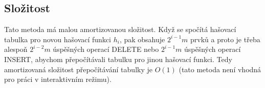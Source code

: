 \subsection{Složitost}

Tato metoda má malou amortizovanou složitost. Když se spočítá hašovací 
tabulka pro novou hašovací funkci $h_i$, pak obsahuje $2^{i-1}m$ prvků a 
proto je třeba alespoň $2^{i-2}m$ úspěšných operací DELETE nebo $2^{i-1}m$ 
úspěšných operací INSERT, abychom přepočítávali tabulku pro jinou hašovací 
funkci. Tedy amortizovaná složitost přepočítávání tabulky je $O(1)$ (tato 
metoda není vhodná pro práci v interaktivním režimu).

